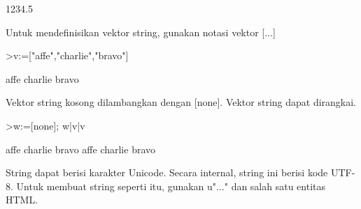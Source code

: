 \documentclass[a4paper,10pt]{article}
\begin{document}
\begin{eulernotebook}
\begin{euleroutput}
  1234.5
\end{euleroutput}
\begin{eulercomment}
Untuk mendefinisikan vektor string, gunakan notasi vektor [...]
\end{eulercomment}
\begin{eulerprompt}
>v:=["affe","charlie","bravo"]
\end{eulerprompt}
\begin{euleroutput}
  affe
  charlie
  bravo
\end{euleroutput}
\begin{eulercomment}
Vektor string kosong dilambangkan dengan [none]. Vektor string dapat
dirangkai.
\end{eulercomment}
\begin{eulerprompt}
>w:=[none]; w|v|v
\end{eulerprompt}
\begin{euleroutput}
  affe
  charlie
  bravo
  affe
  charlie
  bravo
\end{euleroutput}
\begin{eulercomment}
String dapat berisi karakter Unicode. Secara internal, string ini
berisi kode UTF-8. Untuk membuat string seperti itu, gunakan u"..."
dan salah satu entitas HTML.


\end{eulercomment}
\end{eulernotebook}
\end{document}
